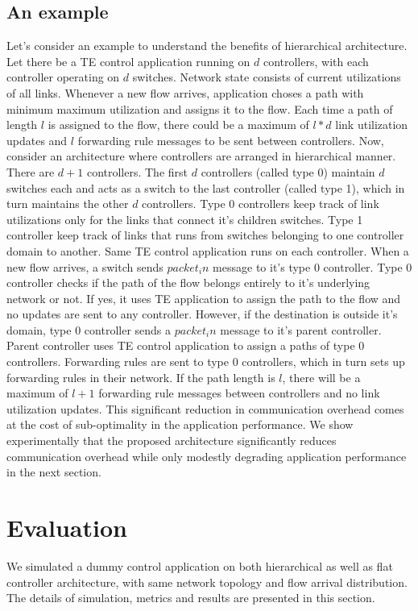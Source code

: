 \documentclass[10pt, twocolumn]{article}
\begin{document}
\subsection{An example}
\label{example}
Let's consider an example to understand the benefits of hierarchical architecture. Let there be a TE control application running on $d$ controllers, with each controller operating on $d$ switches. Network state consists of current utilizations of all links. Whenever a new flow arrives, application choses a path with minimum maximum utilization and assigns it to the flow. Each time a path of length $l$ is assigned to the flow, there could be a maximum of $l*d$ link utilization updates and $l$ forwarding rule messages to be sent between controllers. Now, consider an architecture where controllers are arranged in hierarchical manner. There are $d+1$ controllers. The first $d$ controllers (called type 0) maintain $d$ switches each and acts as a switch to the last controller (called type 1), which in turn maintains the other $d$ controllers. Type 0 controllers keep track of link utilizations only for the links that connect it's children switches. Type 1 controller keep track of links that runs from switches belonging to one controller domain to another. Same TE control application runs on each controller. When a new flow arrives, a switch sends $packet_in$ message to it's type 0 controller. Type 0 controller checks if the path of the flow belongs entirely to it's underlying network or not. If yes, it uses TE application to assign the path to the flow and no updates are sent to any controller. However, if the destination is outside it's domain, type 0 controller sends a $packet_in$ message to it's parent controller. Parent controller uses TE control application to assign a paths of type 0 controllers. Forwarding rules are sent to type 0 controllers, which in turn sets up forwarding rules in their network. If the path length is $l$, there will be a maximum of $l+1$ forwarding rule messages between controllers and no link utilization updates. This significant reduction in communication overhead comes at the cost of sub-optimality in the application performance. We show experimentally that the proposed architecture significantly reduces communication overhead while only modestly degrading application performance in the next section.

\section{Evaluation}
\label{sec:eval}
We simulated a dummy control application on both hierarchical as well as flat controller architecture, with same network topology and flow arrival distribution. The details of simulation, metrics and results are presented in this section.
\end{document}
